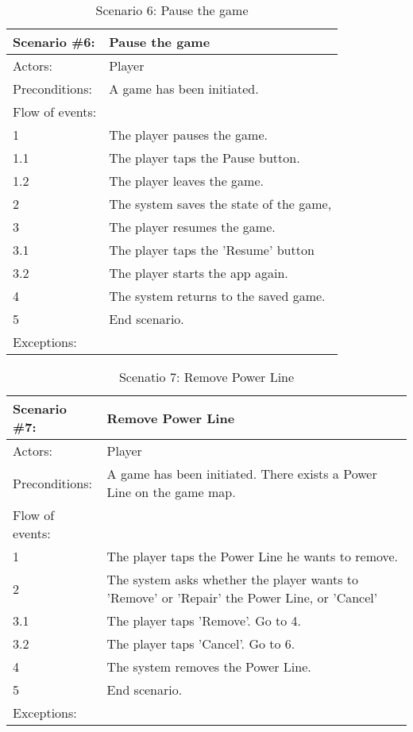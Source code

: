 \begin{table}
	\begin{tabular}{| l | p{10cm} |}
		\hline
		\rowcolor{lightgray}
		{\bf Scenario \#6:} & {\bf Pause the game} \\ \hline
		Actors: & Player \\ \hline
		Preconditions: & A game has been initiated. \\ \hline
		\rowcolor{lightergray}
		Flow of events: & \\ \hline
		1 & The player pauses the game. \\ \hline
		1.1 & The player taps the Pause button. \\ \hline
		1.2 & The player leaves the game. \\ \hline
		2 & The system saves the state of the game, \\ \hline
		3 & The player resumes the game. \\ \hline
		3.1 & The player taps the 'Resume' button \\ \hline
		3.2 & The player starts the app again. \\ \hline
		4 & The system returns to the saved game. \\ \hline
		5 & End scenario. \\ \hline
		\rowcolor{lightergray}
		Exceptions: & \\ \hline
	\end{tabular}
	\caption{Scenario 6: Pause the game}
\end{table}

\begin{table}
	\begin{tabular}{| l | p{10cm} |}
		\hline
		\rowcolor{lightgray}
		{\bf Scenario \#7:} & {\bf Remove Power Line} \\ \hline
		Actors: & Player \\ \hline
		Preconditions: & A game has been initiated. There exists a Power Line on the game map. \\ \hline
		\rowcolor{lightergray}		
		Flow of events: & \\ \hline
		1 & The player taps the Power Line he wants to remove. \\ \hline
		2 & The system asks whether the player wants to 'Remove' or 'Repair' the Power Line, or 'Cancel' \\ \hline
		3.1 & The player taps 'Remove'. Go to 4. \\ \hline
		3.2 & The player taps 'Cancel'. Go to 6. \\ \hline
		4 & The system removes the Power Line. \\ \hline
		5 & End scenario. \\ \hline
		\rowcolor{lightergray}
		Exceptions: & \\ \hline
	\end{tabular}
	\caption{Scenatio 7: Remove Power Line}
\end{table}

